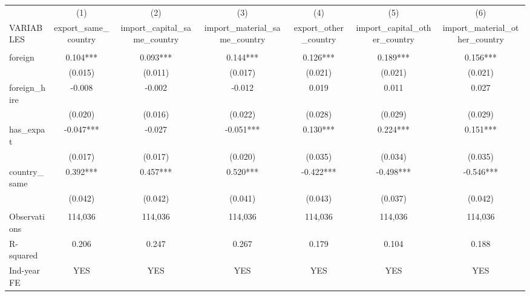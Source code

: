 \begin{tabular}{lcccccc} \hline
 & (1) & (2) & (3) & (4) & (5) & (6) \\
VARIABLES & export\_same\_country & import\_capital\_same\_country & import\_material\_same\_country & export\_other\_country & import\_capital\_other\_country & import\_material\_other\_country \\ \hline
 &  &  &  &  &  &  \\
foreign & 0.104*** & 0.093*** & 0.144*** & 0.126*** & 0.189*** & 0.156*** \\
 & (0.015) & (0.011) & (0.017) & (0.021) & (0.021) & (0.021) \\
foreign\_hire & -0.008 & -0.002 & -0.012 & 0.019 & 0.011 & 0.027 \\
 & (0.020) & (0.016) & (0.022) & (0.028) & (0.029) & (0.029) \\
has\_expat & -0.047*** & -0.027 & -0.051*** & 0.130*** & 0.224*** & 0.151*** \\
 & (0.017) & (0.017) & (0.020) & (0.035) & (0.034) & (0.035) \\
country\_same & 0.392*** & 0.457*** & 0.520*** & -0.422*** & -0.498*** & -0.546*** \\
 & (0.042) & (0.042) & (0.041) & (0.043) & (0.037) & (0.042) \\
 &  &  &  &  &  &  \\
Observations & 114,036 & 114,036 & 114,036 & 114,036 & 114,036 & 114,036 \\
R-squared & 0.206 & 0.247 & 0.267 & 0.179 & 0.104 & 0.188 \\
 Ind-year FE & YES & YES & YES & YES & YES & YES \\ \hline
\end{tabular}
